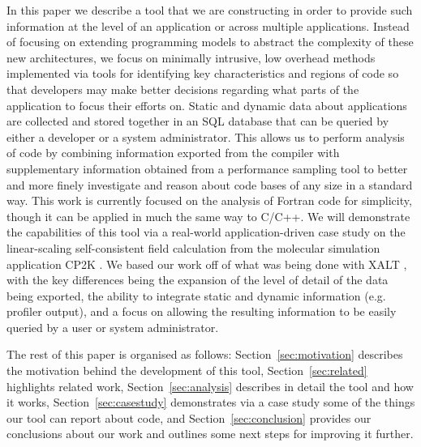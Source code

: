 In this paper we describe a tool that we are constructing in order to provide such information at the level of an application or across multiple applications.
Instead of focusing on extending programming models to abstract the complexity of these new architectures, we focus on minimally intrusive, low overhead methods implemented via tools for identifying key characteristics and regions of code so that developers may make better decisions regarding what parts of the application to focus their efforts on.
Static and dynamic data about applications are collected and stored together in an \acs{SQL} database that can be queried by either a developer or a system administrator.
This allows us to perform analysis of code by combining information exported from the compiler with supplementary information obtained from a performance sampling tool to better and more finely investigate and reason about code bases of any size in a standard way.
This work is currently focused on the analysis of Fortran code for simplicity, though it can be applied in much the same way to C/C++.
We will demonstrate the capabilities of this tool via a real-world application-driven case study on the linear-scaling self-consistent field calculation \cite{vandevondele2012linear} from the molecular simulation application CP2K \cite{hutter2014cp2k}.
We based our work off of what was being done with XALT \cite{7081224}, with the key differences being the expansion of the level of detail of the data being exported, the ability to integrate static and dynamic information (e.g. profiler output), and a focus on allowing the resulting information to be easily queried by a user or system administrator.

The rest of this paper is organised as follows: Section~\ref{sec:motivation} describes the motivation behind the development of this tool, Section~\ref{sec:related} highlights related work, Section~\ref{sec:analysis} describes in detail the tool and how it works, Section~\ref{sec:casestudy} demonstrates via a case study some of the things our tool can report about code, and Section~\ref{sec:conclusion} provides our conclusions about our work and outlines some next steps for improving it further.

